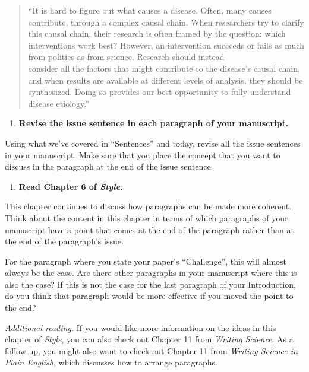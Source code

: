 \documentclass[]{tufte-book}
\providecommand{\tightlist}{%
  \setlength{\itemsep}{0pt}\setlength{\parskip}{0pt}}
\begin{document}
\begin{quote}
``It is hard to figure out what causes a disease. Often, many causes
contribute, through a complex causal chain. When researchers try to clarify
this causal chain, their research is often framed by the question: which
interventions work best? However, an intervention succeeds or fails
as much from politics as from science. Research should instead\\
consider all the factors that might contribute to the disease's causal
chain, and when results are available at different levels of analysis,
they should be synthesized. Doing so provides our best opportunity
to fully understand disease etiology.''
\end{quote}

\begin{enumerate}
\def\labelenumi{\arabic{enumi}.}
\setcounter{enumi}{7}
\tightlist
\item
  \textbf{Revise the issue sentence in each paragraph of your manuscript.}
\end{enumerate}

Using what we've covered in ``Sentences'' and today, revise all the issue
sentences in your manuscript. Make sure that you place the concept that you want
to discuss in the paragraph at the end of the issue sentence.

\begin{enumerate}
\def\labelenumi{\arabic{enumi}.}
\setcounter{enumi}{8}
\tightlist
\item
  \textbf{Read Chapter 6 of \emph{Style}.}
\end{enumerate}

This chapter continues to discuss how paragraphs can be made more coherent.
Think about the content in this chapter in terms of which paragraphs of your
manuscript have a point that comes at the end of the paragraph rather than
at the end of the paragraph's issue.

For the paragraph where you state your paper's ``Challenge'', this will almost
always be the case. Are there other paragraphs in your manuscript where this is
also the case? If this is not the case for the last paragraph of your
Introduction, do you think that paragraph would be more effective if you moved
the point to the end?

\emph{Additional reading.} If you would like more information on the ideas in this
chapter of \emph{Style}, you can also check out Chapter 11 from \emph{Writing Science}.
As a follow-up, you might also want to check out Chapter 11 from \emph{Writing Science
in Plain English}, which discusses how to arrange paragraphs.
\end{document}

